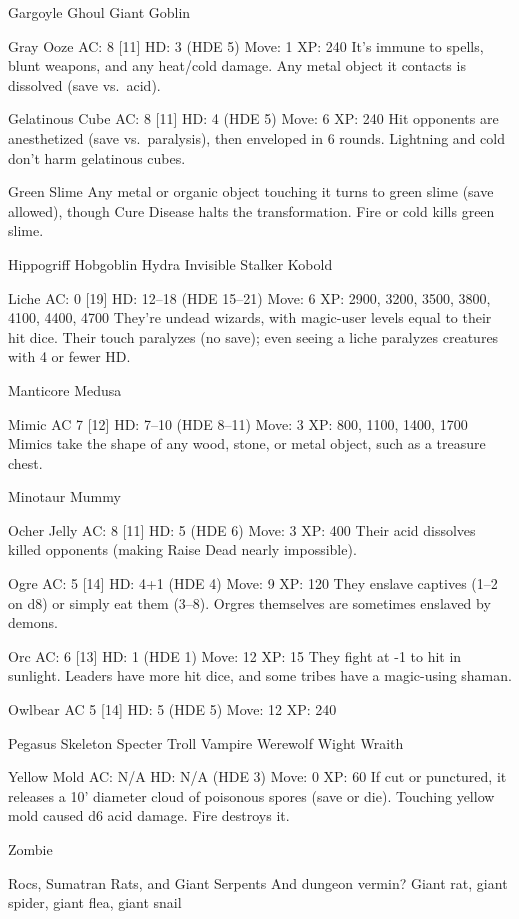 Gargoyle Ghoul Giant Goblin

Gray Ooze AC: 8 {[}11{]} HD: 3 (HDE 5) Move: 1 XP: 240 It's immune to
spells, blunt weapons, and any heat/cold damage. Any metal object it
contacts is dissolved (save vs.~acid).

Gelatinous Cube AC: 8 {[}11{]} HD: 4 (HDE 5) Move: 6 XP: 240 Hit
opponents are anesthetized (save vs.~paralysis), then enveloped in 6
rounds. Lightning and cold don't harm gelatinous cubes.

Green Slime Any metal or organic object touching it turns to green slime
(save allowed), though Cure Disease halts the transformation. Fire or
cold kills green slime.

Hippogriff Hobgoblin Hydra Invisible Stalker Kobold

Liche AC: 0 {[}19{]} HD: 12--18 (HDE 15--21) Move: 6 XP: 2900, 3200,
3500, 3800, 4100, 4400, 4700 They're undead wizards, with magic-user
levels equal to their hit dice. Their touch paralyzes (no save); even
seeing a liche paralyzes creatures with 4 or fewer HD.

Manticore Medusa

Mimic AC 7 {[}12{]} HD: 7--10 (HDE 8--11) Move: 3 XP: 800, 1100, 1400,
1700 Mimics take the shape of any wood, stone, or metal object, such as
a treasure chest.

Minotaur Mummy

Ocher Jelly AC: 8 {[}11{]} HD: 5 (HDE 6) Move: 3 XP: 400 Their acid
dissolves killed opponents (making Raise Dead nearly impossible).

Ogre AC: 5 {[}14{]} HD: 4+1 (HDE 4) Move: 9 XP: 120 They enslave
captives (1--2 on d8) or simply eat them (3--8). Orgres themselves are
sometimes enslaved by demons.

Orc AC: 6 {[}13{]} HD: 1 (HDE 1) Move: 12 XP: 15 They fight at -1 to hit
in sunlight. Leaders have more hit dice, and some tribes have a
magic-using shaman.

Owlbear AC 5 {[}14{]} HD: 5 (HDE 5) Move: 12 XP: 240

Pegasus Skeleton Specter Troll Vampire Werewolf Wight Wraith

Yellow Mold AC: N/A HD: N/A (HDE 3) Move: 0 XP: 60 If cut or punctured,
it releases a 10' diameter cloud of poisonous spores (save or die).
Touching yellow mold caused d6 acid damage. Fire destroys it.

Zombie

Rocs, Sumatran Rats, and Giant Serpents And dungeon vermin? Giant rat,
giant spider, giant flea, giant snail
